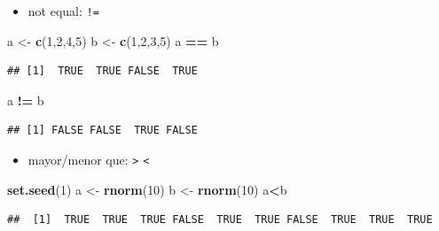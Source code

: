 \documentclass[]{book}
\newenvironment{Shaded}{\begin{snugshade}}{\end{snugshade}}
\newcommand{\KeywordTok}[1]{\textcolor[rgb]{0.13,0.29,0.53}{\textbf{#1}}}
\newcommand{\DecValTok}[1]{\textcolor[rgb]{0.00,0.00,0.81}{#1}}
\newcommand{\StringTok}[1]{\textcolor[rgb]{0.31,0.60,0.02}{#1}}
\newcommand{\OperatorTok}[1]{\textcolor[rgb]{0.81,0.36,0.00}{\textbf{#1}}}
\newcommand{\NormalTok}[1]{#1}
\providecommand{\tightlist}{%
  \setlength{\itemsep}{0pt}\setlength{\parskip}{0pt}}
\begin{document}
\begin{itemize}
\tightlist
\item
  not equal: \texttt{!=}
\end{itemize}

\begin{Shaded}
\begin{Highlighting}[]
\NormalTok{    a <-}\StringTok{ }\KeywordTok{c}\NormalTok{(}\DecValTok{1}\NormalTok{,}\DecValTok{2}\NormalTok{,}\DecValTok{4}\NormalTok{,}\DecValTok{5}\NormalTok{)}
\NormalTok{    b <-}\StringTok{ }\KeywordTok{c}\NormalTok{(}\DecValTok{1}\NormalTok{,}\DecValTok{2}\NormalTok{,}\DecValTok{3}\NormalTok{,}\DecValTok{5}\NormalTok{) }
\NormalTok{    a }\OperatorTok{==}\StringTok{ }\NormalTok{b}
\end{Highlighting}
\end{Shaded}

\begin{verbatim}
## [1]  TRUE  TRUE FALSE  TRUE
\end{verbatim}

\begin{Shaded}
\begin{Highlighting}[]
\NormalTok{    a }\OperatorTok{!=}\StringTok{ }\NormalTok{b}
\end{Highlighting}
\end{Shaded}

\begin{verbatim}
## [1] FALSE FALSE  TRUE FALSE
\end{verbatim}

\begin{itemize}
\tightlist
\item
  mayor/menor que: \texttt{\textgreater{}} \texttt{\textless{}}
\end{itemize}

\begin{Shaded}
\begin{Highlighting}[]
\KeywordTok{set.seed}\NormalTok{(}\DecValTok{1}\NormalTok{)}
\NormalTok{a <-}\StringTok{ }\KeywordTok{rnorm}\NormalTok{(}\DecValTok{10}\NormalTok{)}
\NormalTok{b <-}\StringTok{ }\KeywordTok{rnorm}\NormalTok{(}\DecValTok{10}\NormalTok{)}
\NormalTok{a}\OperatorTok{<}\NormalTok{b}
\end{Highlighting}
\end{Shaded}

\begin{verbatim}
##  [1]  TRUE  TRUE  TRUE FALSE  TRUE  TRUE FALSE  TRUE  TRUE  TRUE
\end{verbatim}
\end{document}
